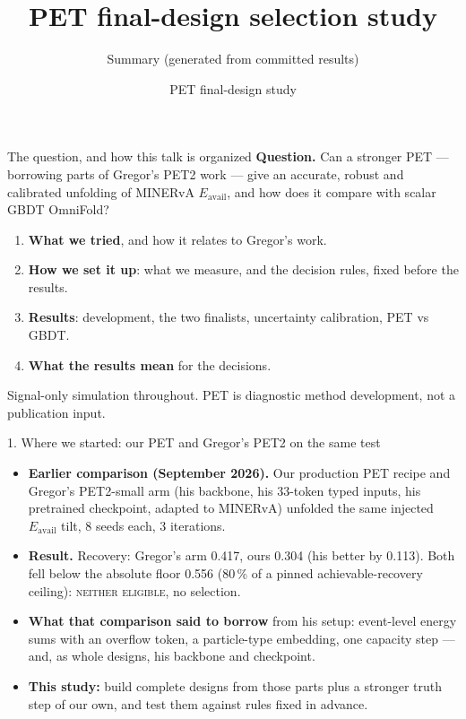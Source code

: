 \documentclass[aspectratio=169,10pt]{beamer}
\title{PET final-design selection study}
\subtitle{Summary (generated from committed results)}
\author{PET final-design study}
\date{\parbox{0.8\linewidth}{\centering\small PET is diagnostic method development. Nothing here is a publication adoption; no historical threshold, verdict or the predecessor campaign's disposition changes; simulation only.}}
\def\evidencetext{}
\begin{document}
\gdef\evidencetext{}
\frame{\titlepage}

\gdef\evidencetext{\texttt{PROTOCOL-20260925.md (1)}}
\begin{frame}{The question, and how this talk is organized}
\small
\textbf{Question.} Can a stronger PET --- borrowing parts of Gregor's PET2 work --- give an accurate, robust and
calibrated unfolding of MINERvA $E_\mathrm{avail}$, and how does it compare with scalar GBDT OmniFold?
\vspace{0.3cm}
\begin{enumerate}
\item \textbf{What we tried}, and how it relates to Gregor's work.
\item \textbf{How we set it up}: what we measure, and the decision rules, fixed before the results.
\item \textbf{Results}: development, the two finalists, uncertainty calibration, PET vs GBDT.
\item \textbf{What the results mean} for the decisions.
\end{enumerate}
\vspace{0.3cm}\footnotesize Signal-only simulation throughout. PET is diagnostic method development, not a
publication input.
\end{frame}

\gdef\evidencetext{\texttt{../configuration\_comparison/campaign\_report.json}; \texttt{nd-unfolding/pet/configuration\_comparison/CONFIGURATION\_COMPARISON-20260918.md (Gregor's minerva-ml pinned at fc9a099; sections cited as cmp)}}
\begin{frame}{1. Where we started: our PET and Gregor's PET2 on the same test}
\small\begin{itemize}\item \textbf{Earlier comparison (September 2026).} Our production PET recipe and Gregor's PET2-small arm (his backbone, his 33-token typed inputs, his pretrained checkpoint, adapted to MINERvA) unfolded the same injected $E_\mathrm{avail}$ tilt, 8 seeds each, 3 iterations.\item \textbf{Result.} Recovery: Gregor's arm 0.417, ours 0.304 (his better by 0.113). Both fell below the absolute floor 0.556 (80\,\% of a pinned achievable-recovery ceiling): \textsc{neither eligible}, no selection.\item \textbf{What that comparison said to borrow} from his setup: event-level energy sums with an overflow token, a particle-type embedding, one capacity step --- and, as whole designs, his backbone and checkpoint.\item \textbf{This study:} build complete designs from those parts plus a stronger truth step of our own, and test them against rules fixed in advance.\end{itemize}
\end{frame}
\end{document}
